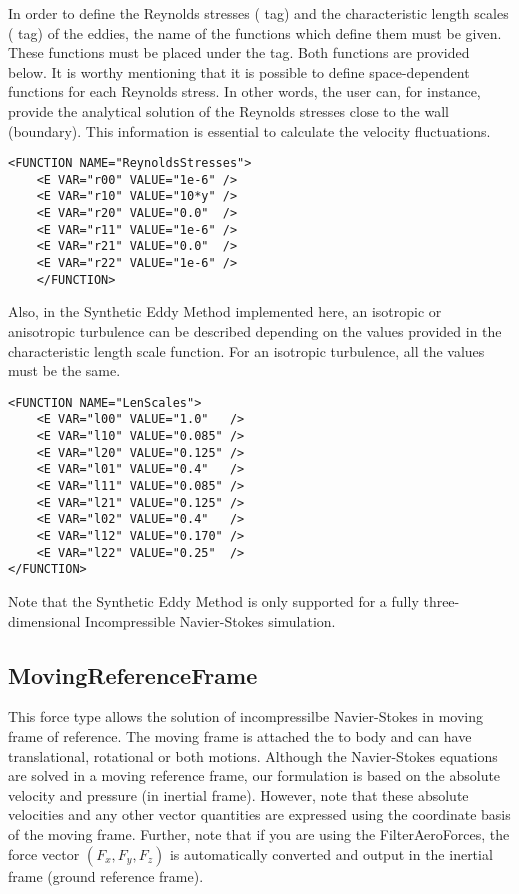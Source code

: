 In order to define the Reynolds stresses ( tag) and the characteristic length scales  ( tag) of the eddies, the name of the functions which define them must be given. These functions must be placed under the    tag. Both functions are provided below. It is worthy mentioning that it is possible to define space-dependent functions for each Reynolds stress. In other words, the user can, for instance, provide the analytical solution of the Reynolds stresses close to the wall (boundary). This information is essential to calculate the velocity fluctuations. 

\begin{lstlisting}[style=XMLStyle] 
    <FUNCTION NAME="ReynoldsStresses">
    <E VAR="r00" VALUE="1e-6" />
    <E VAR="r10" VALUE="10*y" />
    <E VAR="r20" VALUE="0.0"  />
    <E VAR="r11" VALUE="1e-6" />
    <E VAR="r21" VALUE="0.0"  />
    <E VAR="r22" VALUE="1e-6" />
    </FUNCTION>
\end{lstlisting}

Also, in the Synthetic Eddy Method implemented here, an isotropic or anisotropic turbulence can be described depending on the values provided in the characteristic length scale function.  For an isotropic turbulence, all the values must be the same.

\begin{lstlisting}[style=XMLStyle] 
<FUNCTION NAME="LenScales">
    <E VAR="l00" VALUE="1.0"   />
    <E VAR="l10" VALUE="0.085" />
    <E VAR="l20" VALUE="0.125" />
    <E VAR="l01" VALUE="0.4"   />
    <E VAR="l11" VALUE="0.085" />
    <E VAR="l21" VALUE="0.125" />
    <E VAR="l02" VALUE="0.4"   />
    <E VAR="l12" VALUE="0.170" />
    <E VAR="l22" VALUE="0.25"  />
</FUNCTION>
\end{lstlisting}

Note that the Synthetic Eddy Method is only supported for a fully three-dimensional Incompressible Navier-Stokes simulation.

\subsection{MovingReferenceFrame}
This force type allows the solution of incompressilbe Navier-Stokes in moving frame of reference. The moving frame is attached the to body and can have translational, rotational or both motions. Although the Navier-Stokes equations are solved in a moving reference frame, our formulation is based on the absolute velocity and pressure (in inertial frame). However, note that these absolute velocities and any other vector quantities are expressed using the coordinate basis of the moving frame. Further, note that if you are using the FilterAeroForces, the force vector $\left(F_x, F_y, F_z\right)$ is automatically converted and output in the inertial frame (ground reference frame).

